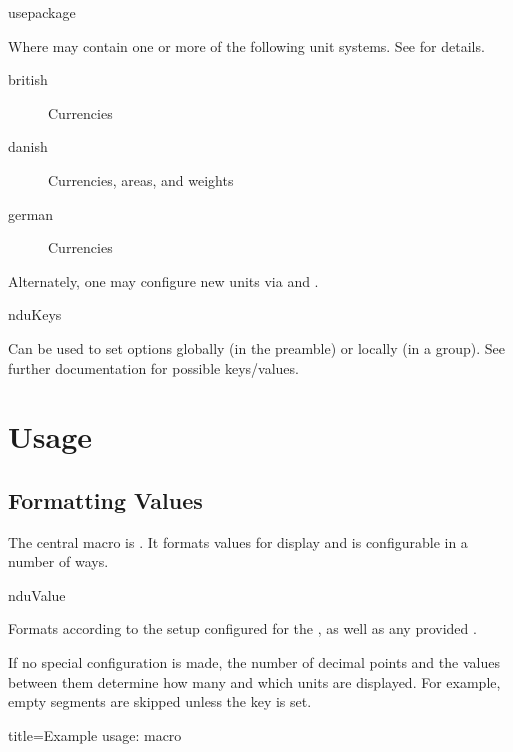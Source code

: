 \documentclass{article}
\begin{document}
\begin{docCommand}
	{usepackage}
	{}

Where  may contain one or more of the following unit systems. See  for details.

\begin{description}
\item[british] Currencies
\item[danish] Currencies, areas, and weights
\item[german] Currencies
\end{description}

Alternately, one may configure new units via  and .

\end{docCommand}

\begin{docCommand}
	{nduKeys}
	{}

	Can be used to set options globally (in the preamble) or locally (in a group). See further documentation for possible keys/values.

\end{docCommand}

\clearpage
\section{Usage} %

\subsection{Formatting Values} %

The central macro is . It formats values for display and is configurable in a number of ways.

\begin{docCommand}
	{nduValue}
	{}

Formats  according to the setup configured for the , as well as any provided .

If no special configuration is made, the number of decimal points and the values between them determine how many and which units are displayed. For example, empty segments are skipped unless the  key is set.
	
\begin{dispExample*}{
	title=Example usage:  macro
}
\\
\\
\\
\\
\end{dispExample*}
\end{docCommand}
\end{document}
